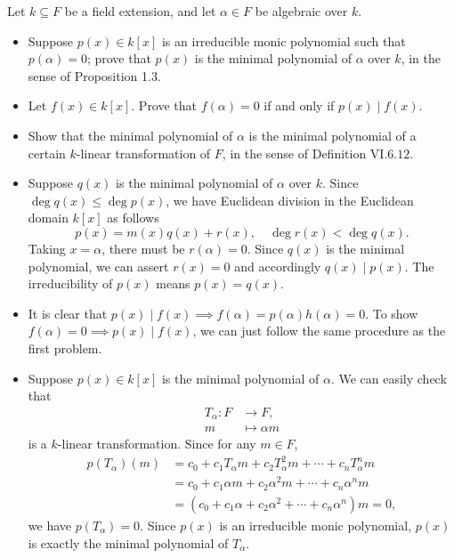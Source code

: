 \documentclass[12pt,letterpaper,boxed]{hmcpset}
\begin{document}
\hypertarget{Exercise VII.1.7}{}
\begin{problem}[1.7]
	Let $k \subseteq F$ be a field extension, and let $\alpha \in F$ be algebraic over $k$.
	\begin{itemize}
		\item Suppose $p(x) \in k[x]$ is an irreducible monic polynomial such that $p(\alpha)=0$; prove that $p(x)$ is the minimal polynomial of $\alpha$ over $k$, in the sense of Proposition 1.3.
		\item Let $f(x) \in k[x]$. Prove that $f(\alpha)=0$ if and only if $p(x) \mid f(x)$.
		\item Show that the minimal polynomial of $\alpha$ is the minimal polynomial of a certain $k$-linear transformation of $F$, in the sense of Definition $\mathrm{VI}.6.12$.
	\end{itemize}
\end{problem}
\begin{solution}
	\begin{itemize}
		\item Suppose $q(x)$ is the minimal polynomial of $\alpha$ over $k$. Since $\deg q(x)\le \deg p(x)$, we have Euclidean division in the Euclidean domain $k[x]$ as follows
		\[
			p(x) = m(x)q(x) + r(x),\quad \deg r(x)<\deg q(x).
		\]
		Taking $x=\alpha$, there must be $r(\alpha)=0$. Since $q(x)$ is the minimal polynomial, we can assert $r(x)=0$ and accordingly $q(x)\mid p(x)$. The irreducibility of $p(x)$ means $p(x) = q(x)$.
		\item It is clear that $p(x) \mid f(x)\implies f(\alpha)=p(\alpha)h(\alpha)=0$. To show $f(\alpha)=0\implies p(x) \mid f(x)$, we can just follow the same procedure as the first problem.
		\item Suppose $p(x) \in k[x]$ is the minimal polynomial of $\alpha$. We can easily check that
		\begin{align*}
			T_\alpha:F&\longrightarrow F,\\
			 m&\longmapsto\alpha m
		\end{align*} 
		is a $k$-linear transformation. Since for any $m\in F$,
		\begin{align*}
			p(T_\alpha)(m)&=c_0+c_1T_\alpha m+c_2T_\alpha^2 m+\cdots+c_nT_\alpha^n m\\
			&=c_0+c_1\alpha m+c_2\alpha^2 m+\cdots+c_n\alpha^n m\\
			&=\left(c_0+c_1\alpha +c_2\alpha^2 +\cdots+c_n\alpha^n\right) m=0,
		\end{align*}
		we have $p(T_\alpha)=0$. Since $p(x)$ is an irreducible monic polynomial, $p(x)$ is exactly the minimal polynomial of $T_\alpha$.
	\end{itemize}
\end{solution}
\end{document}
